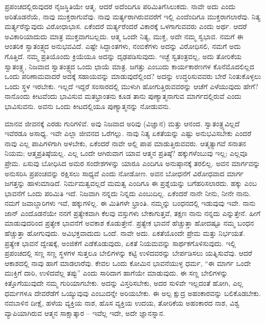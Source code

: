 ಪ್ರಪಂಚದಲ್ಲಿರುವುದರ ನೈಜಸ್ಥಿತಿಯೇ ಆತ್ಮ. ಆದರೆ ಅದೆಂದಿಗೂ ಪರಿಮಿತಿಗೆ\break ಸಿಲುಕದು. ನಾವೇ ಅದು ಎಂದು ಅರಿತೊಡನೆಯೆ, ನಾವು ಮುಕ್ತರಾಗುವೆವು. ನಾವು ಮರ್ತ್ಯರಾಗಿರುವವರೆಗೆ ಇಲ್ಲಿ ಎಂದೆಂದಿಗೂ ಮುಕ್ತರಾಗಲಾರೆವು. ನಿತ್ಯ ಮರ್ತ್ಯರೆನ್ನುವುದು ವಿರೋಧಾಭಾಸ. ಏಕೆಂದರೆ ಮರ್ತ್ಯರೆಂದರೆ ವಿಕಾರಕ್ಕೆ ಒಳಗಾಗುವವರು ಎಂದು ಅರ್ಥ. ಆದರೆ ಅವಿಕಾರಿಯಾದುದು ಮಾತ್ರ ಮುಕ್ತವಾಗಬಲ್ಲದು. ಆತ್ಮ ಒಂದೇ ನಿತ್ಯ, ಮುಕ್ತ, ಅದೇ ನಮ್ಮ ಸ್ವಭಾವ. ನಮಗೆ ಈ ಆಂತರಿಕ ಸ್ವಾತಂತ್ರ್ಯದ ಅನುಭವವಿದೆ. ಎಷ್ಟೇ ಸಿದ್ದಾಂತಗಳು, ನಂಬಿಕೆಗಳು ಅದನ್ನು ವಿರೋಧಿಸಲಿ, ನಮಗೆ ಅದು ಗೊತ್ತಿದೆ. ನಮ್ಮ ಪ್ರತಿಯೊಂದು ಕ್ರಿಯೆಯೂ ಅದನ್ನು ದೃಢಪಡಿಸುವುದು. ಇಚ್ಛೆ ಸ್ವತಂತ್ರವಲ್ಲ, ಅದು ತೋರಿಕೆಯ ಸ್ವಾತಂತ್ರ್ಯ, ನಿಜವಾದ ಸ್ವಾತಂತ್ರ್ಯದ ಒಂದು ಛಾಯೆ ಮಾತ್ರ. ಜಗತ್ತು ಎಂಬುದು ಕಾರ್ಯಕಾರಣಗಳ ಕೊನೆಮೊದಲಿಲ್ಲದ ಒಂದು ಪರಿಣಾಮವಾದರೆ ಅದಕ್ಕೆ ಸಹಾಯವನ್ನು ಮಾಡುವುದೆಲ್ಲಿಂದ? ಅದನ್ನು ಉದ್ಧರಿಸುವವರು ಬೇರೆ ನಿಂತುಕೊಳ್ಳಲು ಒಂದು ಸ್ಥಳ ಇರಬೇಕು. ಇಲ್ಲದೆ ಇದ್ದರೆ ಸಂಸಾರದಲ್ಲಿ ಮುಳುಗಿ ಹೋಗುತ್ತಿರುವವರನ್ನು ಆಚೆಗೆ ಎಳೆಯುವುದು ಹೇಗೆ? ನಾನೊಂದು ಕೀಟವೆಂದು ಭಾವಿಸುವ ಮತಭ್ರಾಂತನು ಕೂಡ ತಾನು ಪುಣ್ಯಾತ್ಮನಾಗುವ ಮಾರ್ಗದಲ್ಲಿರುವೆ ಎಂದು ಭಾವಿಸುವನು. ಅವನು ಒಂದು ಕೀಟದಲ್ಲಿಯೂ ಪುಣ್ಯಾತ್ಮನನ್ನು ನೋಡುವನು.

ಮಾನವ ಜೀವನಕ್ಕೆ ಎರಡು ಗುರಿಗಳಿವೆ. ಅವು ನಿಜವಾದ ಅರಿವು (ವಿಜ್ಞಾನ) ಮತ್ತು ಆನಂದ. ಸ್ವಾತಂತ್ರ್ಯವಿಲ್ಲದೆ ಇವೆರಡೂ ಅಸಾಧ್ಯ. ಇವೇ ಎಲ್ಲಾ ಜೀವನದ ಒರೆಗಲ್ಲು. ನಾವು ನಿತ್ಯ ಏಕತೆಯನ್ನು ಎಷ್ಟು ಅನುಭವಿಸಬೇಕು ಎಂದರೆ ನಾವು ಎಲ್ಲ ಪಾಪಿಗಳಿಗಾಗಿ ಅಳಬೇಕು, ಏಕೆಂದರೆ ನಾವೇ ಅಲ್ಲಿ ಪಾಪ ಮಾಡುತ್ತಿರುವವರು. ಆತ್ಮತ್ಯಾಗವೆ ಸನಾತನ ನಿಯಮ; ಆತ್ಮಪ್ರತಿಷ್ಠೆಯಲ್ಲ. ಎಲ್ಲ ಒಂದೇ ಆಗಿರುವಾಗ ಯಾವ ಆತ್ಮನ ಪ್ರತಿಷ್ಠೆ? ಹಕ್ಕುಗಳೆಂಬುವು ಇಲ್ಲ; ಎಲ್ಲವೂ ಪ್ರೇಮ. ಏಸುವು ಬೋಧಿಸಿದ ಅಮರ ಸಂದೇಶಗಳನ್ನು ಯಾರೂ ಎಂದಿಗೂ ಅನುಷ್ಠಾನಕ್ಕೆ ತರಲಿಲ್ಲ. ಅವನ ಮಾರ್ಗವನ್ನು ಅನುಸರಿಸಿ ಪ್ರಪಂಚವನ್ನು ರಕ್ಷಿಸಲು ಸಾಧ್ಯವೆ ಎಂದು ನೋಡೋಣ. ಅವನ ಬೋಧನೆಗೆ ವಿರೋಧವಾದ ಮಾರ್ಗ ಜಗತ್ತನ್ನು ಹಾಳುಮಾಡಿದೆ. ನಿರ್ಮಮತ್ವವಲ್ಲದೆ ಮಮತ್ವ ಎಂದಿಗೂ ಈ ಪ್ರಶ್ನೆಯನ್ನು ಬಗೆಹರಿಸಲಾರದು. ಹಕ್ಕು ಎಂಬ ಭಾವನೆಗೆ ಒಂದು ಪರಿಮಿತಿ ಇದೆ. ನಿಜವಾಗಿ ನನ್ನದು ನಿನ್ನದು ಎಂಬುದಿಲ್ಲ. ಏಕೆಂದರೆ ನಾನೇ ನೀನು, ನೀನೇ ನಾನು. ನಮಗೆ ಜವಾಬ್ದಾರಿಗಳು ಇವೆ, ಹಕ್ಕುಗಳಿಲ್ಲ. ಈ ಮಿತಿಗಳೇ ಭ್ರಾಂತಿ. ನಮ್ಮನ್ನು ಬಂಧನದಲ್ಲಿ ಇಡುವುವು ಇವೇ. ನಾನು ಜಾನ್ ಎಂದೊಡನೆಯೇ ನನಗೆ ಪ್ರತ್ಯೇಕವಾಗಿ ಕೆಲವು ವಸ್ತುಗಳು ಬೇಕಾಗುತ್ತವೆ, ತಕ್ಷಣ ನಾನು ನನ್ನದು ಎನ್ನುತ್ತೇನೆ. ಹೀಗೆ ಮಾಡುವುದರಿಂದ ಪ್ರತ್ಯೇಕ ಭಾವನೆಗೆ ಅವಕಾಶ ಕೊಡುತ್ತೇನೆ. ಪ್ರತ್ಯೇಕ ಭಾವನೆ ಹೆಚ್ಚುತ್ತಾ ಹೋದಷ್ಟೂ ನಮ್ಮ ಬಂಧನ ಹೆಚ್ಚುತ್ತಾ ಹೋಗುವುದು. ಅವಿಭಕ್ತವಾದುದು ಒಂದೆ. ನಾವೇ ಅದು. ಏಕತೆಯೊಂದೇ ಪ್ರೇಮ ಮತ್ತು ನಿರ್ಭಯತೆ. ಪ್ರತ್ಯೇಕ ಭಾವನೆ ದ್ವೇಷಕ್ಕೆ, ಅಂಜಿಕೆಗೆ ಎಡೆಕೊಡುವುದು, ಏಕತೆ ನಿಯಮವನ್ನು ಸಾರ್ಥಕಗೊಳಿಸುವುದು. ಇಲ್ಲಿ ಪ್ರಪಂಚದಲ್ಲಿ ಸಣ್ಣ ಸಣ್ಣ ಸ್ಥಳಗಳ ಸುತ್ತಲೂ ಬೇಲಿಗಳನ್ನು ಕಟ್ಟಿ ಉಳಿದವರನ್ನು ಬೇರ್ಪಡಿಸಲು ಯತ್ನಿಸುವೆವು. ಆದರೆ ಆಕಾಶದಲ್ಲಿ ನಾವು ಹಾಗೆ ಮಾಡಲಾರೆವು. ಕೇವಲ ಒಂದು ಕೋಮಿನ ಭಾವನೆಯುಳ್ಳ ಧರ್ಮ, “ಈ ಮಾರ್ಗ ಒಂದೇ ಮುಕ್ತಿಗೆ ದಾರಿ, ಉಳಿದವೆಲ್ಲ ತಪ್ಪು'' ಎಂದು ಸಾರಿದಾಗ ಹಾಗೆಯೇ ಮಾಡುವುದು. ಈ ಸಣ್ಣ ಬೇಲಿಗಳನ್ನು ಕಿತ್ತೊಗೆಯುವುದೇ ನಮ್ಮ ಗುರಿಯಾಗಬೇಕು. ಅದನ್ನು ವಿಸ್ತರಿಸಬೇಕು, ಅದರ ಸುಳಿವೇ ಇಲ್ಲದಂತೆ ಹೋಗಿ, ಎಲ್ಲ ಧರ್ಮಗಳೂ ದೇವರೆಡೆಗೆ ಒಯ್ಯುವುವು ಎಂಬುದನ್ನೇ ಅರಿಯಬೇಕು. ಈ ಅಲ್ಪ ಕ್ಷುದ್ರ ಅಹಂಕಾರವನ್ನು ಬಲಿಕೊಡಬೇಕು. ನವಬಾಳಿನ ದೀಕ್ಷೆ, ಹಳೆಯ ವ್ಯಕ್ತಿಯ ನಾಶ, ಹೊಸ ವ್ಯಕ್ತಿಯ ಉದಯ, ತೋರಿಕೆಯ ಅಹಂಕಾರದ ನಾಶ, ವಿಶ್ವ ವ್ಯಾಪಿಯಾಗಿರುವ ಆತ್ಮನ ಸಾಕ್ಷಾತ್ಕಾರ – ಇವೆಲ್ಲ ಇದೇ, ಅದೇ ಜ್ಞಾನಸ್ನಾನ.

